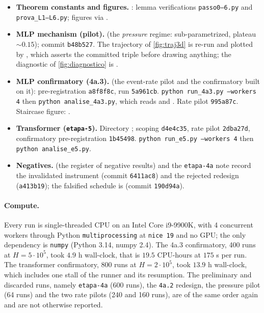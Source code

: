 \documentclass[11pt]{article}
\theoremstyle{definition}
\theoremstyle{remark}
\begin{document}
{\sloppy
\begin{itemize}
\item \textbf{Theorem constants and figures.} : lemma
verifications \texttt{passo0--6.py} and \texttt{prova\_L1--L6.py}; figures via
.
\item \textbf{MLP mechanism (pilot).}
 (the \emph{pressure} regime:
sub-parametrized, plateau $\sim0.15$); commit \texttt{b48b527}. The trajectory of
\cref{fig:traj3d} is re-run and plotted by
, which asserts the committed
triple before drawing anything; the diagnostic of \cref{fig:diagnostico} is
.
\item \textbf{MLP confirmatory (4a.3).}  (the
event-rate pilot and the confirmatory built on it): pre-registration
\texttt{a8f8f8c}, run \texttt{5a961cb}.
\texttt{python run\_4a3.py --workers 4} then \texttt{python analise\_4a3.py},
which reads  and . Rate pilot
\texttt{995a87c}. Staircase figure: .
\item \textbf{Transformer (\texttt{etapa-5}).} Directory
; scoping \texttt{d4e4c35}, rate
pilot \texttt{2dba27d}, confirmatory
pre-registration \texttt{1b45498}.
\texttt{python run\_e5.py --workers 4} then \texttt{python analise\_e5.py}.
\item \textbf{Negatives.}  (the register of
negative results) and the \texttt{etapa-4a} note record the invalidated instrument
(commit \texttt{6411ac8}) and the rejected redesign (\texttt{a413b19}); the
falsified schedule is  (commit \texttt{190d94a}).
\end{itemize}
\par}

\paragraph{Compute.}
Every run is single-threaded CPU on an Intel Core i9-9900K, with 4 concurrent
workers through Python \texttt{multiprocessing} at \texttt{nice 19} and no GPU;
the only dependency is \texttt{numpy} (Python 3.14, numpy 2.4). The 4a.3
confirmatory, 400 runs at $H=5\cdot10^{5}$, took $4.9$ h wall-clock, that is
$19.5$ CPU-hours at $175$ s per run. The transformer confirmatory, 800 runs at
$H=2\cdot10^{5}$, took $13.9$ h wall-clock, which includes one stall of the
runner and its resumption. The preliminary and discarded
runs, namely \texttt{etapa-4a} (600 runs), the \texttt{4a.2} redesign, the
pressure pilot (64
runs) and the two rate pilots (240 and 160 runs), are of the same order again and
are not otherwise reported.
\end{document}
